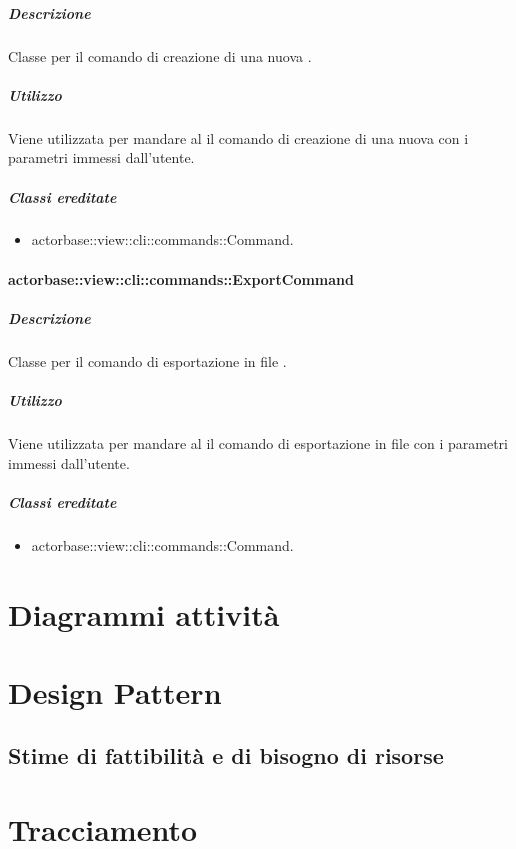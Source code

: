 \documentclass{scalatekids-article}
\begin{document}
\subparagraph{Descrizione}

Classe per il comando di creazione di una nuova .

\subparagraph{Utilizzo}

Viene utilizzata per mandare al  il comando di creazione di una nuova  con i parametri immessi dall'utente.

\subparagraph{Classi ereditate}

\begin{itemize}
\item actorbase::view::cli::commands::Command.
\end{itemize}

\paragraph{actorbase::view::cli::commands::ExportCommand}

\subparagraph{Descrizione}

Classe per il comando di esportazione in file .

\subparagraph{Utilizzo}

Viene utilizzata per mandare al  il comando di esportazione in file  con i parametri immessi dall'utente.

\subparagraph{Classi ereditate}

\begin{itemize}
\item actorbase::view::cli::commands::Command.
\end{itemize}

\section{Diagrammi attività}

\section{Design Pattern}

\subsection{Stime di fattibilità e di bisogno di risorse}

\section{Tracciamento}
\end{document}
